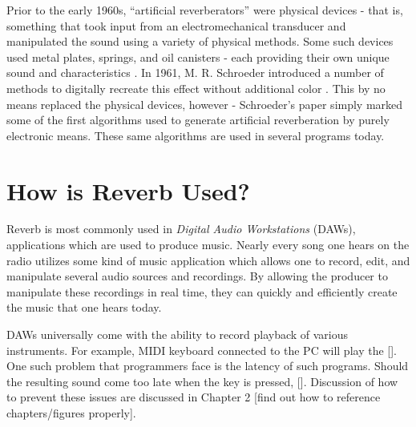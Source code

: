 Prior to the early 1960s, ``artificial reverberators'' were physical devices - that is, something that took input from an electromechanical transducer and manipulated the sound using a variety of physical methods. Some such devices used metal plates, springs, and oil canisters - each providing their own unique sound and characteristics \cite{FiftyYears}. In 1961, M. R. Schroeder introduced a number of methods to digitally recreate this effect without additional color \cite{schroeder1961natural}. This by no means replaced the physical devices, however - Schroeder's paper simply marked some of the first algorithms used to generate artificial reverberation by purely electronic means. These same algorithms are used in several programs today.

\section{How is Reverb Used?}
Reverb is most commonly used in \textit{Digital Audio Workstations} (DAWs), applications which are used to produce music. Nearly every song one hears on the radio utilizes some kind of music application which allows one to record, edit, and manipulate several audio sources and recordings. By allowing the producer to manipulate these recordings in real time, they can quickly and efficiently create the music that one hears today.

DAWs universally come with the ability to record playback of various instruments. For example, MIDI keyboard connected to the PC will play the []. One such problem that programmers face is the latency of such programs. Should the resulting sound come too late when the key is pressed, []. Discussion of how to prevent these issues are discussed in Chapter 2 [find out how to reference chapters/figures properly].




